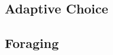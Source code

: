 \documentclass[a4paper, oneside, 11pt, onecolumn]{article}
\begin{document}
\subsection{Adaptive Choice}

\subsection{Foraging}
\end{document}
